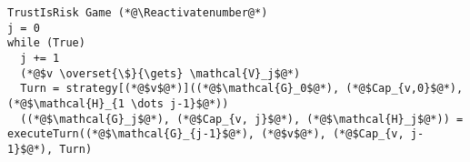 {}
\Suppressnumber
\begin{lstlisting}[label=trustisriskgame, style=numbers]
TrustIsRisk Game (*@\Reactivatenumber@*)
j = 0
while (True)
  j += 1
  (*@$v \overset{\$}{\gets} \mathcal{V}_j$@*)
  Turn = strategy[(*@$v$@*)]((*@$\mathcal{G}_0$@*), (*@$Cap_{v,0}$@*), (*@$\mathcal{H}_{1 \dots j-1}$@*))
  ((*@$\mathcal{G}_j$@*), (*@$Cap_{v, j}$@*), (*@$\mathcal{H}_j$@*)) = executeTurn((*@$\mathcal{G}_{j-1}$@*), (*@$v$@*), (*@$Cap_{v, j-1}$@*), Turn)
\end{lstlisting}
